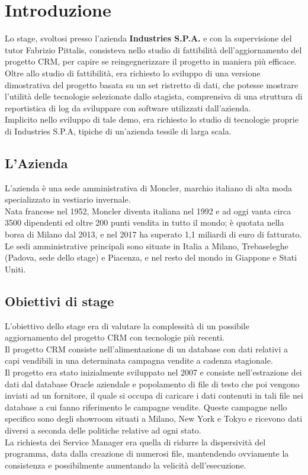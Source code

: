 \pagestyle{fancy}
\fancyhf{}
\fancyhead{}
\thispagestyle{fancy}
\fancyhead[RO, LE] {\thepage}
\fancyfoot{}

\section{Introduzione}
Lo stage, svoltosi presso l'azienda \textbf{Industries S.P.A.} e con la supervisione del tutor Fabrizio Pittalis, consisteva nello studio di fattibilità dell'aggiornamento del progetto CRM, per capire se reingegnerizzare il progetto in maniera più efficace.\\
Oltre allo studio di fattibilità, era richiesto lo sviluppo di una versione dimostrativa del progetto basata su un set ristretto di dati, che potesse mostrare l'utilità delle tecnologie selezionate dallo stagista, comprensiva di una struttura di reportistica di log da sviluppare con software utilizzati dall'azienda.\\
Implicito nello sviluppo di tale demo, era richiesto lo studio di tecnologie proprie di Industries S.P.A, tipiche di un'azienda tessile di larga scala.

\subsection{L'Azienda}
L'azienda è una sede amministrativa di Moncler, marchio italiano di alta moda specializzato in vestiario invernale.\\
Nata francese nel 1952, Moncler diventa italiana nel 1992 e ad oggi vanta circa 3500 dipendenti ed oltre 200 punti vendita in tutto il mondo; è quotata nella borsa di Milano dal 2013, e nel 2017 ha superato 1,1 miliardi di euro di fatturato.\\
Le sedi amministrative principali sono situate in Italia a Milano, Trebaseleghe (Padova, sede dello stage) e Piacenza, e nel resto del mondo in Giappone e Stati Uniti.

\subsection{Obiettivi di stage}
L'obiettivo dello stage era di valutare la complessità di un possibile aggiornamento del progetto CRM con tecnologie più recenti.\\
Il progetto CRM consiste nell'alimentazione di un database con dati relativi a capi vendibili in una determinata campagna vendite a cadenza stagionale.\\
Il progetto era stato inizialmente sviluppato nel 2007 e consiste nell'estrazione dei dati dal database Oracle aziendale e popolamento di file di testo che poi vengono inviati ad un fornitore, il quale si occupa di caricare i dati contenuti in tali file nei database a cui fanno riferimento le campagne vendite. Queste campagne nello specifico sono degli showroom situati a Milano, New York e Tokyo e ricevono dati diversi a seconda delle politiche relative ad ogni stato.\\
La richiesta dei Service Manager era quella di ridurre la dispersività del programma, data dalla creazione di numerosi file, mantendendo ovviamente la consistenza e possibilmente aumentando la velicità dell'esecuzione.

